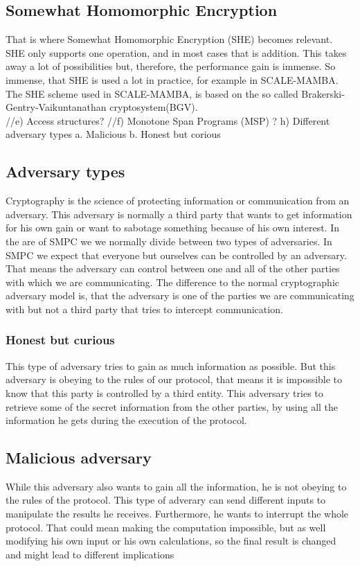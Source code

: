 \documentclass[english,runningheads,a4paper]{llncs}[2018/03/10]
\begin{document}
\subsection{Somewhat Homomorphic Encryption}
That is where Somewhat Homomorphic Encryption (SHE) becomes relevant. SHE only supports one operation, and in most cases that is addition. This takes away a lot of possibilities but, therefore, the performance gain is immense. So immense, that SHE is used a lot in practice, for example in SCALE-MAMBA.\\
The SHE scheme used in SCALE-MAMBA, is based on the so called Brakerski-Gentry-Vaikuntanathan cryptosystem(BGV).\\



//e)	Access structures?
//f)	Monotone Span Programs (MSP) ?
h)	Different adversary types
a.	Malicious
b.	Honest but corious

\subsection{Adversary types}
Cryptography is the science of protecting information or communication from an adversary. This adversary is normally a third party that wants to get information for his own gain or want to sabotage something because of his own interest. In the are of SMPC we we normally divide between two types of adversaries. In SMPC we expect that everyone but ourselves can be controlled by an adversary.  That means the adversary can control between one and all of the other parties with which we are communicating. The difference to the normal cryptographic adversary model is, that the adversary is one of the parties we are communicating with but not a third party that tries to intercept communication.
\subsubsection{Honest but curious}
This type of adversary tries to gain as much information as possible. But this adversary is obeying to the rules of our protocol, that means it is impossible to know that this party is controlled by a third entity. This adversary tries to retrieve some of the secret information from the other parties, by using all the information he gets during the execution of the protocol.

\subsection{Malicious adversary}
While this adversary also wants to gain all the information, he is not obeying to the rules of the protocol. This type of adverary can send different inputs to manipulate the results he receives. Furthermore, he wants to interrupt the whole protocol. That could mean making the computation impossible, but as well modifying his own input or his own calculations, so the final result is changed and might lead to different implications
\end{document}
